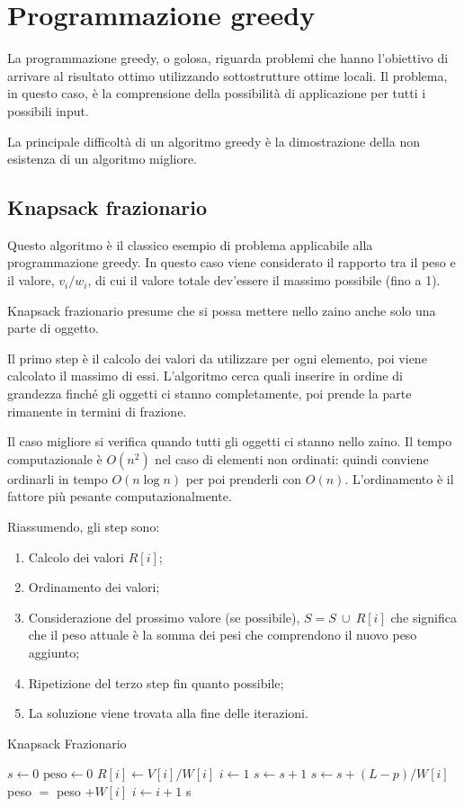 \section{Programmazione greedy}
La programmazione greedy, o golosa, riguarda problemi che hanno l'obiettivo di arrivare al risultato ottimo utilizzando sottostrutture ottime locali. Il problema, in questo caso, è la comprensione della possibilità di applicazione per tutti i possibili input. 

La principale difficoltà di un algoritmo greedy è la dimostrazione della non esistenza di un algoritmo migliore.

\subsection{Knapsack frazionario}
Questo algoritmo è il classico esempio di problema applicabile alla programmazione greedy. In questo caso viene considerato il rapporto tra il peso e il valore, $v_i/w_i$, di cui il valore totale dev'essere il massimo possibile (fino a 1).

Knapsack frazionario presume che si possa mettere nello zaino anche solo una parte di oggetto. 

Il primo step è il calcolo dei valori da utilizzare per ogni elemento, poi viene calcolato il massimo di essi. L'algoritmo cerca quali inserire in ordine di grandezza finché gli oggetti ci stanno completamente, poi prende la parte rimanente in termini di frazione. 

Il caso migliore si verifica quando tutti gli oggetti ci stanno nello zaino. Il tempo computazionale è $O(n^2)$ nel caso di elementi non ordinati: quindi conviene ordinarli in tempo $O(n \log n)$ per poi prenderli con $O(n)$. L'ordinamento è il fattore più pesante computazionalmente.

Riassumendo, gli step sono:
\begin{enumerate}
	\item Calcolo dei valori $R[i]$;
	\item Ordinamento dei valori;
	\item Considerazione del prossimo valore (se possibile), $S = S\ \cup\ R[i]$ che significa che il peso attuale è la somma dei pesi che comprendono il nuovo peso aggiunto;
	\item Ripetizione del terzo step fin quanto possibile;
	\item La soluzione viene trovata alla fine delle iterazioni.
\end{enumerate}
\begin{algorithm}[H]
	\caption{Knapsack Frazionario}
	\begin{algorithmic}
			\State $s \gets 0$
			\State $\text{peso} \gets 0$
				\State $R[i] \gets V[i] / W[i]$
			\EndFor
			\State {}
			\State $i \gets 1$
					\State $s \gets s + 1$
				\Else
					\State $s \gets s + (L - p) / W[i]$
				\EndIf
				\State peso $=$ peso $ + W[i]$
				\State $i \gets i + 1$
			\EndWhile
			\State \Return s
		\EndFunction
	\end{algorithmic}
\end{algorithm}

